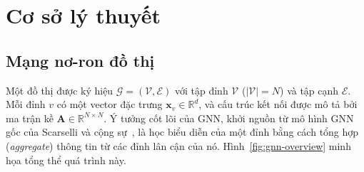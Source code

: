 \chapter{Cơ sở lý thuyết}
\section{Mạng nơ-ron đồ thị}

Một đồ thị được ký hiệu $\mathcal{G}=(\mathcal{V},\mathcal{E})$ với tập đỉnh $\mathcal{V}$ ($|\mathcal{V}|=N$) và tập cạnh $\mathcal{E}$. Mỗi đỉnh $v$ có một vector đặc trưng $\mathbf{x}_v \in \mathbb{R}^{d}$, và cấu trúc kết nối được mô tả bởi ma trận kề $\mathbf{A}\in\mathbb{R}^{N\times N}$. Ý tưởng cốt lõi của GNN, khởi nguồn từ mô hình GNN gốc của Scarselli và cộng sự~\cite{Scarselli2009}, là học biểu diễn của một đỉnh bằng cách tổng hợp (\textit{aggregate}) thông tin từ các đỉnh lân cận của nó. Hình~\ref{fig:gnn-overview} minh họa tổng thể quá trình này.

